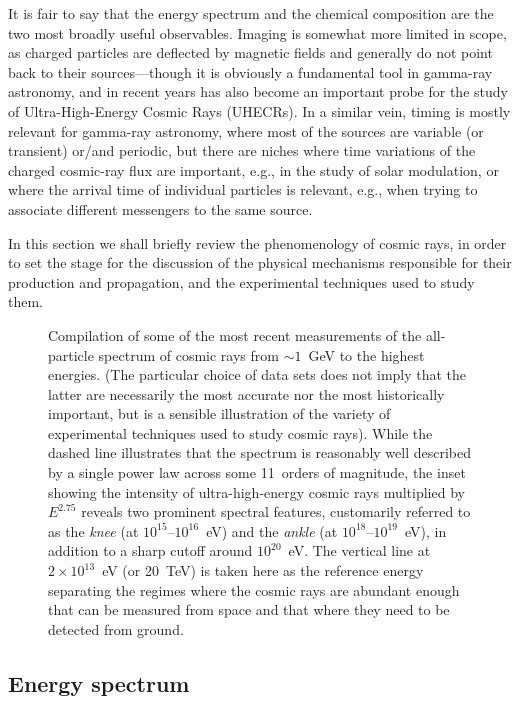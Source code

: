 It is fair to say that the energy spectrum and the chemical composition are the two
most broadly useful observables. Imaging is somewhat more limited in scope, as charged
particles are deflected by magnetic fields and generally do not point back to their
sources---though it is obviously a fundamental tool in gamma-ray astronomy, and in
recent years has also become an important probe for the study of Ultra-High-Energy
Cosmic Rays (UHECRs). In a similar vein, timing is mostly relevant for gamma-ray
astronomy, where most of the sources are variable (or transient) or/and periodic,
but there are niches where time variations of the charged cosmic-ray flux are important,
e.g., in the study of solar modulation, or where the arrival time of individual
particles is relevant, e.g., when trying to associate different messengers to the
same source.

In this section we shall briefly review the phenomenology of cosmic rays, in order to
set the stage for the discussion of the physical mechanisms responsible for their
production and propagation, and the experimental techniques used to study them.

\begin{figure}[!htbp]
  
  \caption{Compilation of some of the most recent measurements of the all-particle
    spectrum of cosmic rays from $\sim 1$~GeV to the highest energies.
    (The particular choice of data sets does not imply that the latter are necessarily
    the most accurate nor the most historically important, but is a sensible
    illustration of the variety of experimental techniques used to study cosmic rays).
    While the dashed line illustrates that the spectrum is reasonably well described
    by a single power law across some 11~orders of magnitude, the inset showing the
    intensity of ultra-high-energy cosmic rays multiplied by $E^{2.75}$ reveals
    two prominent spectral features, customarily referred to as the \emph{knee}
    (at $10^{15}$--$10^{16}$~eV) and the \emph{ankle} (at $10^{18}$--$10^{19}$~eV),
    in addition to a sharp cutoff around $10^{20}$~eV. The vertical line at
    $2 \times 10^{13}$~eV (or 20~TeV) is taken here as the reference energy separating
    the regimes where the cosmic rays are abundant enough that can be measured from
    space and that where they need to be detected from ground.}
  \label{fig:cr_intensity}
\end{figure}


\subsection{Energy spectrum}

